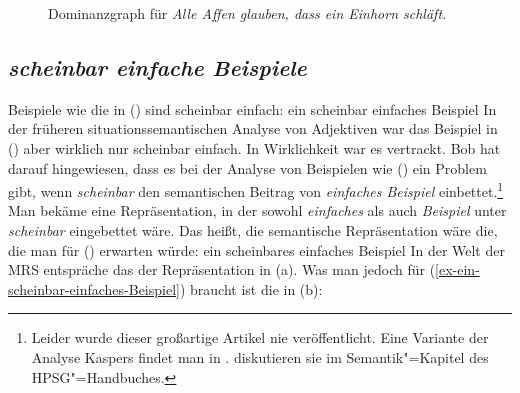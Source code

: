 \begin{figure}
\caption{Dominanzgraph für \emph{Alle Affen glauben, dass ein Einhorn schläft.}}\label{fig-alle-Affen-glauben-dass-ein-Einhorn-schläft}

\end{figure}

\subsection{\emph{scheinbar einfache Beispiele}}
\label{Abschnitt-scheinbar-einfache-Beispiele}

Beispiele wie die in () sind scheinbar einfach:
\ea
\label{ex-ein-scheinbar-einfaches-Beispiel}
ein scheinbar einfaches Beispiel
\z
In der früheren situationssemantischen Analyse von Adjektiven war das Beispiel in () aber
wirklich nur scheinbar einfach. In Wirklichkeit war es vertrackt. Bob \citet{Kasper97a} hat darauf hingewiesen,
dass es bei der Analyse von Beispielen wie () ein Problem gibt, wenn \emph{scheinbar} den
semantischen Beitrag von \emph{einfaches Beispiel} einbettet.\footnote{%
 Leider wurde dieser großartige Artikel nie veröffentlicht. Eine Variante der Analyse Kaspers
 findet man in . \citet[Abschnitt~3.2]{KR2024a} diskutieren sie im Semantik"=Kapitel des HPSG"=Handbuches.
} Man bekäme eine Repräsentation, in der sowohl \emph{einfaches} als auch \emph{Beispiel} unter
\emph{scheinbar} eingebettet wäre. Das heißt, die semantische Repräsentation wäre die, die man für
() erwarten würde:
\ea
ein scheinbares einfaches Beispiel
\z
In der Welt der MRS entspräche das der Repräsentation in (a). Was man jedoch für (\ref{ex-ein-scheinbar-einfaches-Beispiel}) braucht ist die in (b):

\eal
\ex {}
\ex
\label{mrs-ein-scheinbar-einfaches-Beispiel} 
\zl

